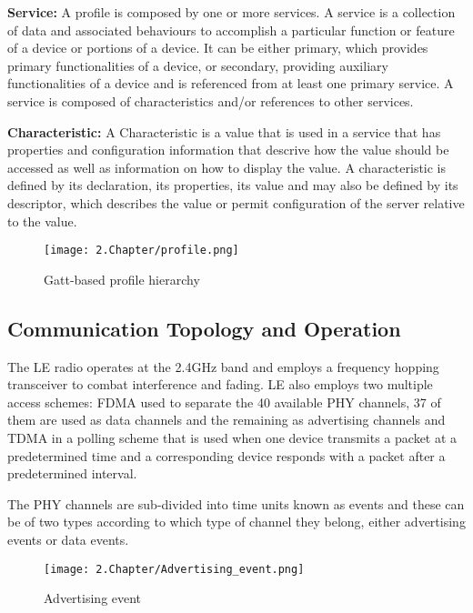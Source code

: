 \tab \textbf{Service:} A profile is composed by one or more services. A service is a collection of data and associated behaviours to accomplish a particular function or feature of a device or portions of a device. It can be either primary, which provides primary functionalities of a device, or secondary, providing auxiliary functionalities of a device and is referenced from at least one primary service. A service is composed of characteristics and/or references to other services.

\tab \textbf{Characteristic:} A Characteristic is a value that is used in a service that has properties and configuration information that descrive how the value should be accessed as well as information on how to display the value. A characteristic is defined by its declaration, its properties, its value and may also be defined by its descriptor, which describes the value or permit configuration of
the server relative to the value.

\begin{figure}[H]
	\centering
		\texttt{[image: 2.Chapter/profile.png]}
	\caption[Gatt-based profile hierarchy]{Gatt-based profile hierarchy}
	\label{fig:profile}
\end{figure}


\subsection{Communication Topology and Operation}
\label{subsec:Communication}

The \ac{LE} radio operates at the 2.4GHz band and employs a frequency hopping transceiver to combat interference and fading. \ac{LE} also employs two multiple access schemes: \ac{FDMA} used to separate the 40 available \ac{PHY} channels, 37 of them are used as data channels and the remaining as advertising channels and \ac{TDMA} in a polling scheme that is used when one device transmits a packet at a predetermined time and a corresponding device responds with a packet after a predetermined interval.

The \ac{PHY} channels are sub-divided into time units known as events and these can be of two types according to which type of channel they belong, either advertising events or data events. 

\begin{figure}[H]
	\centering
		\texttt{[image: 2.Chapter/Advertising\_event.png]}
	\caption[Advertising event]{Advertising event}
	\label{fig:ad_event}
\end{figure}

